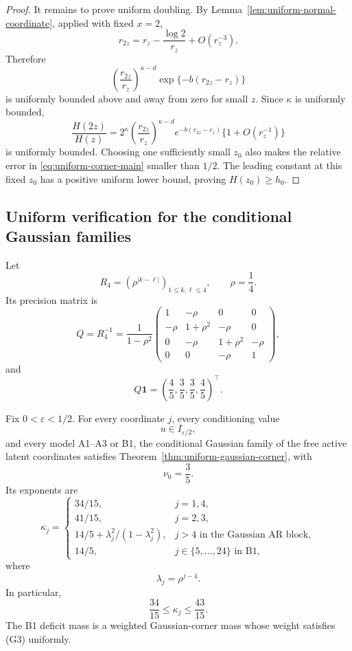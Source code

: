 \begin{proof}
It remains to prove uniform doubling. By
Lemma~\ref{lem:uniform-normal-coordinate}, applied with fixed
\(x=2\),
\begin{equation}
 r_{2z}
 =
 r_z-\frac{\log2}{r_z}+O(r_z^{-3}).
 \label{eq:r2z-expansion}
\end{equation}
Therefore
\[
 \left(\frac{r_{2z}}{r_z}\right)^{\kappa-d}
 \exp\{-b(r_{2z}-r_z)\}
\]
is uniformly bounded above and away from zero for small \(z\).
Since \(\kappa\) is uniformly bounded,
\[
 \frac{H(2z)}{H(z)}
 =
 2^\kappa
 \left(\frac{r_{2z}}{r_z}\right)^{\kappa-d}
 e^{-b(r_{2z}-r_z)}
 \{1+O(r_z^{-1})\}
\]
is uniformly bounded. Choosing one sufficiently small \(z_0\)
also makes the relative error in
\eqref{eq:uniform-corner-main} smaller than \(1/2\). The leading
constant at this fixed \(z_0\) has a positive uniform lower
bound, proving \(H(z_0)\ge h_0\).
\end{proof}


\subsection{Uniform verification for the conditional Gaussian families}

Let
\[
 R_4=(\rho^{|k-\ell|})_{1\le k,\ell\le4},
 \qquad \rho=\frac14.
\]
Its precision matrix is
\begin{equation}
 Q=R_4^{-1}
 =
 \frac1{1-\rho^2}
 \begin{pmatrix}
 1&-\rho&0&0\\
 -\rho&1+\rho^2&-\rho&0\\
 0&-\rho&1+\rho^2&-\rho\\
 0&0&-\rho&1
 \end{pmatrix},
 \label{eq:R4-precision}
\end{equation}
and
\begin{equation}
 Q\mathbf 1
 =
 \left(\frac45,\frac35,\frac35,\frac45\right)^\top.
 \label{eq:R4-row-sums}
\end{equation}

\begin{corollary}
\label{cor:corner-model-families}
Fix \(0<\varepsilon<1/2\). For every coordinate \(j\), every
conditioning value
\[
 u\in I_{\varepsilon/2},
\]
and every model A1--A3 or B1, the conditional Gaussian family of
the free active latent coordinates satisfies
Theorem~\ref{thm:uniform-gaussian-corner}, with
\[
 \nu_0=\frac35.
\]
Its exponents are
\begin{equation}
 \kappa_j=
 \begin{cases}
  34/15,&j=1,4,\\
  41/15,&j=2,3,\\
  14/5+\lambda_j^2/(1-\lambda_j^2),
       &j>4\text{ in the Gaussian AR block},\\
  14/5,&j\in\{5,\ldots,24\}\text{ in B1},
 \end{cases}
 \label{eq:corner-kappas-rigorous}
\end{equation}
where
\[
 \lambda_j=\rho^{j-4}.
\]
In particular,
\[
 \frac{34}{15}\le\kappa_j\le\frac{43}{15}.
\]
The B1 deficit mass is a weighted Gaussian-corner mass whose
weight satisfies (G3) uniformly.
\end{corollary}

